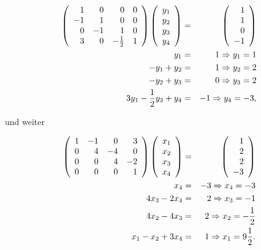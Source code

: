 \documentclass[12pt]{article}
\begin{document}
\begin{eqnarray*}
\left ( \begin{array}{r r r r} 
 1	&	 0	& 0 & 0 \\
-1  &  1  & 0 & 0 \\
 0  & -1  & 1 & 0 \\ 
 3  &  0  & -\frac{1}{2} & 1 \\ 
\end{array}  \right )  
\left ( \begin{array}{r} 
 y_1 \\
 y_2 \\
 y_3  \\
 y_4 \\ 
\end{array}  \right ) 
& = &
\left ( \begin{array}{r} 
 1 \\
 1 \\
 0  \\ 
 -1 \\ 
\end{array}  \right ) \\
y_1 & = & 1 				 \Rightarrow  y_1 = 1 \\
-y_1 + y_2 & = & 1   \Rightarrow  y_2 = 2 \\
-y_2 + y_3 & = & 0   \Rightarrow  y_3 = 2 \\
3y_1 -\frac{1}{2}y_3 + y_4 & = & -1  \Rightarrow  y_4 = -3 ,\\
\end{eqnarray*} 

und weiter


\begin{eqnarray*}
\left ( \begin{array}{r r r r} 
 1	&	 -1	& 0 & 3 \\
 0  &  4  & -4 & 0 \\
 0  &  0  & 4 & -2 \\ 
 0  &  0  & 0 & 1 \\ 
\end{array}  \right )  
\left ( \begin{array}{r} 
 x_1 \\
 x_2 \\
 x_3  \\
 x_4 \\ 
\end{array}  \right ) 
& = &
\left ( \begin{array}{r} 
 1 \\
 2 \\
 2  \\ 
 -3 \\ 
\end{array}  \right ) \\
x_4 & = & -3 				  \Rightarrow  x_4 = -3 \\
4x_3 - 2x_4 & = & 2   \Rightarrow  x_3 = -1 \\
4x_2 - 4x_3 & = & 2   \Rightarrow  x_2 = - \frac{1}{2} \\
x_1 - x_2 + 3x_4 & = & 1  \Rightarrow  x_1 = 9 \frac{1}{2}. \\
\end{eqnarray*} 
\end{document}
